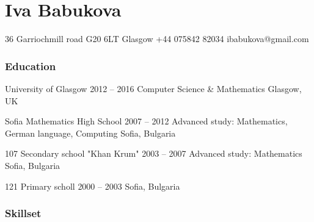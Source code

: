\documentclass{tccv}
\begin{document}
\setlength{\emergencystretch}{3em}
\part{Iva Babukova}

%
\personal
    {36 Garriochmill road \newline G20 6LT Glasgow}
    {+44 075842 82034}
    {ibabukova@gmail.com}

\section{Education}

\begin{yearlist}

\item[University of Glasgow]
     {2012 -- 2016}
     {Computer Science \& Mathematics}
     {Glasgow, UK}

\item[Sofia Mathematics High School]
     {2007 -- 2012}
     {Advanced study: Mathematics, German language, Computing}
     {Sofia, Bulgaria}

\item[107 Secondary school "Khan Krum"]
     {2003 -- 2007}
     {Advanced study: Mathematics}
     {Sofia, Bulgaria}

\item[121 Primary scholl]
     {2000 -- 2003}
     {Sofia, Bulgaria}

\end{yearlist}

\section{Skillset}
\end{document}
